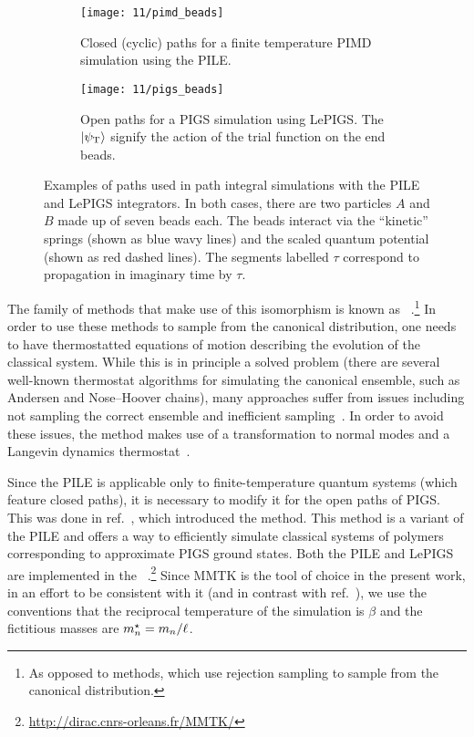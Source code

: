 \begin{figure}
	\begin{subfigure}[b]{\textwidth}
		\centering
		\texttt{[image: 11/pimd\_beads]}
		\caption{
			Closed (cyclic) paths for a finite temperature PIMD simulation using the PILE.
		}
		\vspace{4 mm}
	\end{subfigure}
	\begin{subfigure}[b]{\textwidth}
		\centering
		\texttt{[image: 11/pigs\_beads]}
		\caption{
			Open paths for a PIGS simulation using LePIGS.
			The $\ket{\psi_\mathrm{T}}$ signify the action of the trial function on the end beads.
		}
	\end{subfigure}
	\caption[
		Examples of paths used in path integral simulations
	]{
		Examples of paths used in path integral simulations with the PILE and LePIGS integrators.
		In both cases, there are two particles $A$ and $B$ made up of seven beads each.
		The beads interact via the ``kinetic'' springs (shown as blue wavy lines) and the scaled quantum potential (shown as red dashed lines).
		The segments labelled $\tau$ correspond to propagation in imaginary time by $\tau$.
	}
	\label{fig:beads}
\end{figure}

The family of methods that make use of this isomorphism is known as ~\cite[471,479]{tuckerman2010statistical}.\footnote{
	As opposed to  methods, which use rejection sampling to sample from the canonical distribution.
}
In order to use these methods to sample from the canonical distribution, one needs to have thermostatted equations of motion describing the evolution of the classical system.
While this is in principle a solved problem (there are several well-known thermostat algorithms for simulating the canonical ensemble, such as Andersen and Nose--Hoover chains), many approaches suffer from issues including not sampling the correct ensemble and inefficient sampling~\cite{bussi2007accurate,ceriotti2010efficient}.
In order to avoid these issues, the  method makes use of a transformation to normal modes and a Langevin dynamics thermostat~\cite{ceriotti2010efficient}.

Since the PILE is applicable only to finite-temperature quantum systems (which feature closed paths), it is necessary to modify it for the open paths of PIGS.
This was done in ref.~\cite{constable2013langevin}, which introduced the  method. 
This method is a variant of the PILE and offers a way to efficiently simulate classical systems of polymers corresponding to approximate PIGS ground states.
Both the PILE and LePIGS are implemented in the ~\cite{hinsen2000molecular}.\footnote{
	\url{http://dirac.cnrs-orleans.fr/MMTK/}
}
Since MMTK is the tool of choice in the present work, in an effort to be consistent with it (and in contrast with ref.~\cite{ceriotti2010efficient}), we use the conventions that the reciprocal temperature of the simulation is $\beta$ and the fictitious masses are ${m}^\star_n = m_n / \ell$.

